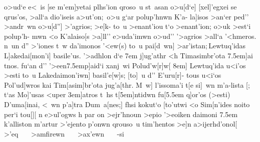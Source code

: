 \documentclass[11pt]{report}
\begin{document}
{\obeylines\everypar{\quad}
o>ud`e e<~is [se m'em]yetai plhs'ion qroso~u
st~asan o>u[d`e] [xel]'egxei se qrus'os, >all`a
dio'iseis a>ut'on;\,{\selectfont %
o>u g`ar polup'hnwn K'a-}\bifida*[.1]
\postlineam{\fontencoding{OT1}\fontfamily{cmr}\fontseries{b}\selectfont
\tiny\,]}%
{\selectfont %
la]isos >an`er ped'' >andr~wn o>u[d''] >'agrios;} >e[k-
to~u >enant'iou t`o >enant'ion; o>uk >est`i polup'h-
mwn <o K'alaiso[s >a]ll'' e>uda'imwn o>ud'' '>agrios
>all`a '<hmeros. {\selectfont %
n~un d'' >'iones t~w da'imonos}\bifida*[.1]
\postlineam{\fontencoding{OT1}\fontfamily{cmr}\fontseries{b}\selectfont
\tiny\,]}%
'<ew(s) to~u %
{\selectfont pai[d~wn] >ar'istan;}\,Lewtuq'idas
L]akedai[mon'i] basile'us.  '>adhlon d`e
\leavevmode\kern 7em j]ug'athr <h Timasimbr'ota
\leavevmode\kern 7.5em]\punctum ai tnos. {\selectfont %
fu`an d'' '>een}\bifida*[.1]
\leavevmode\kern 7.5em{\selectfont p]aid`i xanj~wi Polud'w[r]w[}
\leavevmode\kern 8em] Lewtuq'ida u<i'os >esti to~u 
Lakedaimon'iwn] basil'e[w]s; [to]~u d'' E'uru[r]-
tous u<i`os Pol'ud]wros kai Tim[asim]br'ota
jug'a[thr. {\selectfont%
M~w] l'issoma'i t[e si]~wn m'a-\coronis*
lista} [; t`as Mo]'usas <uper \punctum\lbrack\kern 3em]\punctum atros
t~hs t[\kern 5em]ntidwn fu[\kern 5.5em q]or'os (>esti)
D'uma[inai, <~wn p'a]tra Dum~a[nes;]
}
\vspace{5ex}
{\obeylines\everypar{\quad}
fhsi kokut`o [\linea*
to'utwi <o Sim[n'ides
noito per`i tou[\punctum][
\margini[-2.5em]{\Obelus*}\punctum n e>ul'ogws h par\punctum[2]\lbrack
{}on >ejr'hnoun >epio\punctum\lbrack
'>eoiken daimoni\punctum\lbrack
}
\vspace{5ex}
{\obeylines\everypar{\quad}
\leavevmode\kern 7.5em k'alliston m'artur >'ejento p'onwn
qrouso~u tim'hentos >e\semi]n a>ijerhd'onol[
}
\vspace{5ex}
\ \ \ %
>'eq\ \ \ %
>amfirewn\ \ \ %
>a\erasa{}x'ewn\ \ \ %
-si
\end{document}
